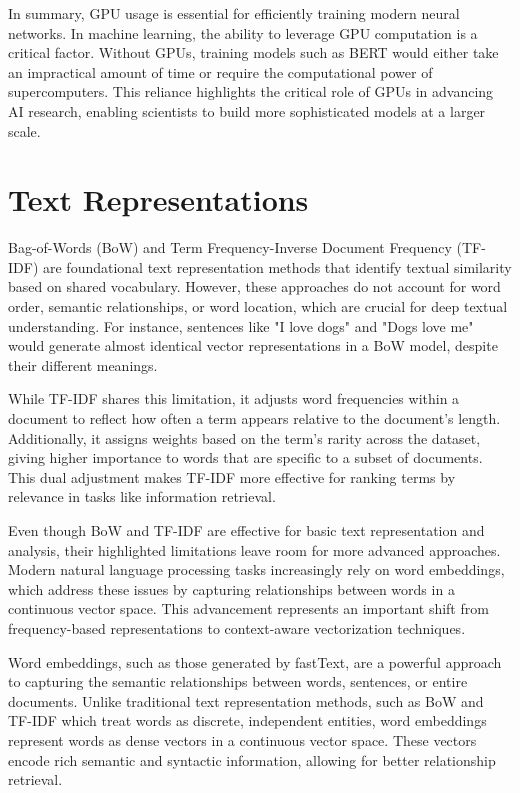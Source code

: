 In summary, GPU usage is essential for efficiently training modern neural networks. In machine learning, the ability to leverage GPU computation is a critical factor. Without GPUs, training models such as BERT would either take an impractical amount of time or require the computational power of supercomputers. This reliance highlights the critical role of GPUs in advancing AI research, enabling scientists to build more sophisticated models at a larger scale.

\section{Text Representations}

Bag-of-Words (BoW) and Term Frequency-Inverse Document Frequency (TF-IDF) are foundational text representation methods that identify textual similarity based on shared vocabulary. However, these approaches do not account for word order, semantic relationships, or word location, which are crucial for deep textual understanding. For instance, sentences like "I love dogs" and "Dogs love me" would generate almost identical vector representations in a BoW model, despite their different meanings.

\vspace{3mm}

While TF-IDF shares this limitation, it adjusts word frequencies within a document to reflect how often a term appears relative to the document's length. Additionally, it assigns weights based on the term's rarity across the dataset, giving higher importance to words that are specific to a subset of documents. This dual adjustment makes TF-IDF more effective for ranking terms by relevance in tasks like information retrieval.


\vspace{3mm} %

Even though BoW and TF-IDF are effective for basic text representation and analysis, their highlighted limitations leave room for more advanced approaches. Modern natural language processing tasks increasingly rely on word embeddings, which address these issues by capturing relationships between words in a continuous vector space. This advancement represents an important shift from frequency-based representations to context-aware vectorization techniques.

\vspace{3mm}

Word embeddings, such as those generated by fastText, are a powerful approach to capturing the semantic relationships between words, sentences, or entire documents. Unlike traditional text representation methods, such as BoW and TF-IDF which treat words as discrete, independent entities, word embeddings represent words as dense vectors in a continuous vector space. These vectors encode rich semantic and syntactic information, allowing for better relationship retrieval.

